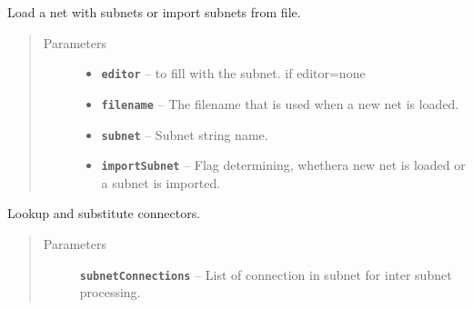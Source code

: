 \documentclass[a4paper,10pt,english]{sphinxmanual}
\begin{document}
\begin{fulllineitems}
\begin{fulllineitems}
\label{gui_link:gui.MainWindow.MainWindow.loadNet}
Load a net with subnets or import subnets from file.
\begin{quote}\begin{description}
\item[{Parameters}] \leavevmode\begin{itemize}
\item {} 
\textbf{\texttt{editor}} --  to fill with the subnet.  if editor=none

\item {} 
\textbf{\texttt{filename}} -- The filename that is used when a new net is loaded.

\item {} 
\textbf{\texttt{subnet}} -- Subnet string name.

\item {} 
\textbf{\texttt{importSubnet}} -- Flag determining, whethera new net is loaded or a subnet is imported.

\end{itemize}

\end{description}\end{quote}

\end{fulllineitems}


\begin{fulllineitems}
\label{gui_link:gui.MainWindow.MainWindow.lookupSubstitutionConnectors}
Lookup and substitute connectors.
\begin{quote}\begin{description}
\item[{Parameters}] \leavevmode
\textbf{\texttt{subnetConnections}} -- List of connection in subnet for inter subnet processing.

\end{description}\end{quote}

\end{fulllineitems}



\end{fulllineitems}
\end{document}
